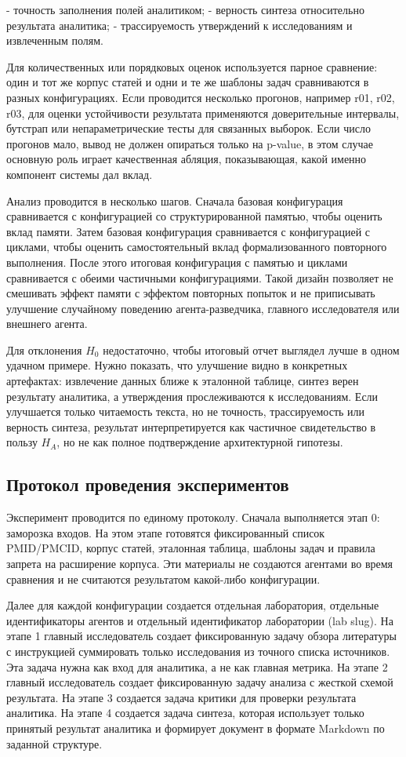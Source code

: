 - точность заполнения полей аналитиком;
- верность синтеза относительно результата аналитика;
- трассируемость утверждений к исследованиям и извлеченным полям.

Для количественных или порядковых оценок используется парное сравнение: один и тот же корпус статей и одни и те же шаблоны задач сравниваются в разных конфигурациях. Если проводится несколько прогонов, например r01, r02, r03, для оценки устойчивости результата применяются доверительные интервалы, бутстрап или непараметрические тесты для связанных выборок. Если число прогонов мало, вывод не должен опираться только на p-value, в этом случае основную роль играет качественная абляция, показывающая, какой именно компонент системы дал вклад.

Анализ проводится в несколько шагов. Сначала базовая конфигурация сравнивается с конфигурацией со структурированной памятью, чтобы оценить вклад памяти. Затем базовая конфигурация сравнивается с конфигурацией с циклами, чтобы оценить самостоятельный вклад формализованного повторного выполнения. После этого итоговая конфигурация с памятью и циклами сравнивается с обеими частичными конфигурациями. Такой дизайн позволяет не смешивать эффект памяти с эффектом повторных попыток и не приписывать улучшение случайному поведению агента-разведчика, главного исследователя или внешнего агента.

Для отклонения $H_0$ недостаточно, чтобы итоговый отчет выглядел лучше в одном удачном примере. Нужно показать, что улучшение видно в конкретных артефактах: извлечение данных ближе к эталонной таблице, синтез верен результату аналитика, а утверждения прослеживаются к исследованиям. Если улучшается только читаемость текста, но не точность, трассируемость или верность синтеза, результат интерпретируется как частичное свидетельство в пользу $H_A$, но не как полное подтверждение архитектурной гипотезы.

\subsection{Протокол проведения экспериментов}

Эксперимент проводится по единому протоколу. Сначала выполняется этап 0: заморозка входов. На этом этапе готовятся фиксированный список PMID/PMCID, корпус статей, эталонная таблица, шаблоны задач и правила запрета на расширение корпуса. Эти материалы не создаются агентами во время сравнения и не считаются результатом какой-либо конфигурации.

Далее для каждой конфигурации создается отдельная лаборатория, отдельные идентификаторы агентов и отдельный идентификатор лаборатории (lab slug). На этапе 1 главный исследователь создает фиксированную задачу обзора литературы с инструкцией суммировать только исследования из точного списка источников. Эта задача нужна как вход для аналитика, а не как главная метрика. На этапе 2 главный исследователь создает фиксированную задачу анализа с жесткой схемой результата. На этапе 3 создается задача критики для проверки результата аналитика. На этапе 4 создается задача синтеза, которая использует только принятый результат аналитика и формирует документ в формате Markdown по заданной структуре.

